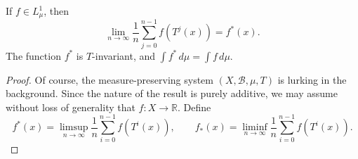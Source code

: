 \documentclass[11pt,a4paper]{article}
\begin{document}
\setcounter{theorem}{13}\begin{theorem}
\label{thm:l3-birkhoff}
If $f\in L^1_\mu$, then
\[
 \lim_{n\to\infty}\frac1n\sum_{j=0}^{n-1}f(T^j(x))=f^*(x).
\]
The function $f^*$ is $T$-invariant, and $\int f^*\,d\mu=\int f\,d\mu$.
\end{theorem}
\begin{proof}
Of course, the measure-preserving system $(X,\mathcal B,\mu,T)$ is lurking
in the background. Since the nature of the result is purely additive, we
may assume without loss of generality that $f:X\to\mathbb R$. Define
\[
 f^*(x)=\limsup_{n\to\infty}\frac1n\sum_{i=0}^{n-1}f(T^i(x)),
 \qquad
 f_*(x)=\liminf_{n\to\infty}\frac1n\sum_{i=0}^{n-1}f(T^i(x)).
\]

\end{proof}
\end{document}
